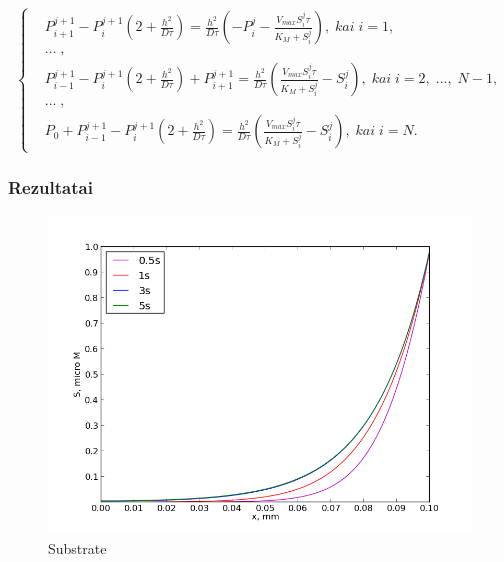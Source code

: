 \documentclass[12pt, a4paper, lithuanian]{article}
\begin{document}
\begin{equation}
\left\{
\begin{aligned}
    &P_{i+1}^{j+1}-P_i^{j+1}\left(2+\frac{h^2}{D\tau}\right)
    = \frac{h^2}{D\tau} \left(-P_i^j -\frac{V_{max}S_i^j\tau}{K_M+S_i^j}\right),\; kai \; i = 1,\\
    &\dots\;,\\
    &P_{i-1}^{j+1}-P_i^{j+1}\left(2+\frac{h^2}{D\tau}\right)+P_{i+1}^{j+1}
        = \frac{h^2}{D\tau}
    \left(\frac{V_{max}S_i^j\tau}{K_M+S_i^j}-S_i^j\right),\; kai\; i =
        2,\;...,\;N-1,\\
    &\dots\;,\\
    &P_0 + P_{i-1}^{j+1} - P_i^{j+1}\left(2+\frac{h^2}{D\tau}\right)
        =  \frac{h^2}{D\tau}
        \left(\frac{V_{max}S_i^j\tau}{K_M+S_i^j}-S_i^j\right),\; kai\; i = N.
\end{aligned}
\right.
\end{equation}

\subsubsection{Rezultatai}

\begin{figure}[H]
    \centering
    \includegraphics[scale=0.5]{img/S}
    \caption{Substrate}
    \label{img:mlp}
\end{figure}
\end{document}
